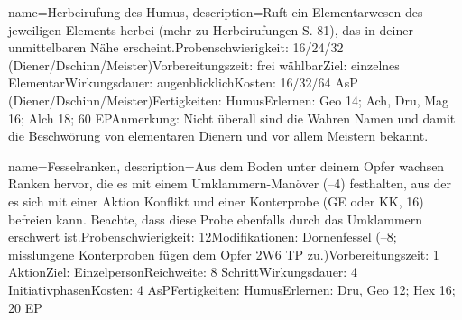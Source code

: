 {
    name={Herbeirufung des Humus},
    description={Ruft ein Elementarwesen des jeweiligen Elements herbei (mehr zu Herbeirufungen S. 81), das in deiner unmittelbaren Nähe erscheint.\newline Probenschwierigkeit: 16/24/32 (Diener/Dschinn/Meister)\newline Vorbereitungszeit: frei wählbar\newline Ziel: einzelnes Elementar\newline Wirkungsdauer: augenblicklich\newline Kosten: 16/32/64 AsP (Diener/Dschinn/Meister)\newline Fertigkeiten: Humus\newline Erlernen: Geo 14; Ach, Dru, Mag 16; Alch 18; 60 EP\newline Anmerkung: Nicht überall sind die Wahren Namen und damit die Beschwörung von elementaren Dienern und vor allem Meistern bekannt. }
}


{
    name={Fesselranken},
    description={Aus dem Boden unter deinem Opfer wachsen Ranken hervor, die es mit einem Umklammern-Manöver (–4) festhalten, aus der es sich mit einer Aktion Konflikt und einer Konterprobe (GE oder KK, 16) befreien kann. Beachte, dass diese Probe ebenfalls durch das Umklammern erschwert ist.\newline Probenschwierigkeit: 12\newline Modifikationen: Dornenfessel (–8; misslungene Konterproben fügen dem Opfer 2W6 TP zu.)\newline Vorbereitungszeit: 1 Aktion\newline Ziel: Einzelperson\newline Reichweite: 8 Schritt\newline Wirkungsdauer: 4 Initiativphasen\newline Kosten: 4 AsP\newline Fertigkeiten: Humus\newline Erlernen: Dru, Geo 12; Hex 16; 20 EP}
}


